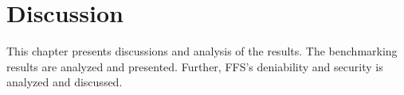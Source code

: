 
\chapter{Discussion}
\label{ch:discussion}
This chapter presents discussions and analysis of the results. The benchmarking results are analyzed and presented. Further, FFS's deniability and security is analyzed and discussed.




